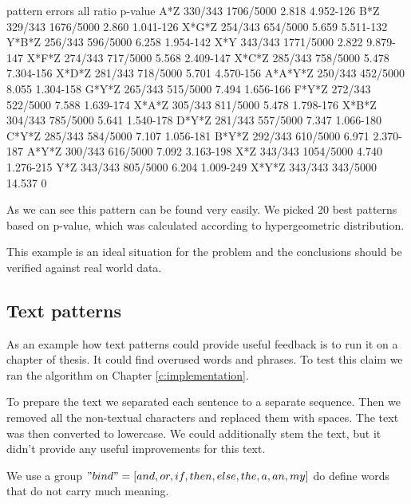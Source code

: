 \begin{file}
pattern     errors      all            ratio      p-value
A*Z         330/343     1706/5000      2.818      4.952-126
B*Z         329/343     1676/5000      2.860      1.041-126
X*G*Z       254/343     654/5000       5.659      5.511-132
Y*B*Z       256/343     596/5000       6.258      1.954-142
X*Y         343/343     1771/5000      2.822      9.879-147
X*F*Z       274/343     717/5000       5.568      2.409-147
X*C*Z       285/343     758/5000       5.478      7.304-156
X*D*Z       281/343     718/5000       5.701      4.570-156
A*A*Y*Z     250/343     452/5000       8.055      1.304-158
G*Y*Z       265/343     515/5000       7.494      1.656-166
F*Y*Z       272/343     522/5000       7.588      1.639-174
X*A*Z       305/343     811/5000       5.478      1.798-176
X*B*Z       304/343     785/5000       5.641      1.540-178
D*Y*Z       281/343     557/5000       7.347      1.066-180
C*Y*Z       285/343     584/5000       7.107      1.056-181
B*Y*Z       292/343     610/5000       6.971      2.370-187
A*Y*Z       300/343     616/5000       7.092      3.163-198
X*Z         343/343     1054/5000      4.740      1.276-215
Y*Z         343/343     805/5000       6.204      1.009-249
X*Y*Z       343/343     343/5000       14.537     0
\end{file}

As we can see this  pattern can be found very easily. We picked 20 best patterns based on p-value, which was calculated according to hypergeometric distribution.

This example is an ideal situation for the problem and the conclusions should be verified against real world data.

\subsection{Text patterns}

As an example how text patterns could provide useful feedback is to run it on a chapter of thesis. It could find overused words and phrases. To test this claim we ran the algorithm on Chapter \ref{c:implementation}.

To prepare the text we separated each sentence to a separate sequence. Then we removed all the non-textual characters and replaced them with spaces. The text was then converted to lowercase. We could additionally stem the text, but it didn't provide any useful improvements for this text.

We use a group $"bind" = [and, or, if, then, else, the, a, an, my]$ do define words that do not carry much meaning.

